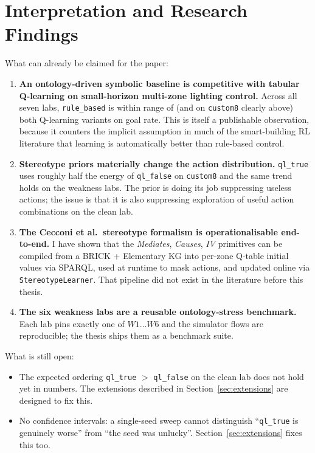 \documentclass[conference]{IEEEtran}
\begin{document}
\section{Interpretation and Research Findings}
\label{sec:findings}

What can already be claimed for the paper:

\begin{enumerate}
  \item \textbf{An ontology-driven symbolic baseline is competitive
        with tabular Q-learning on small-horizon multi-zone lighting
        control.} Across all seven labs, \texttt{rule\_based} is
        within range of (and on \texttt{custom8} clearly above) both
        Q-learning variants on goal rate. This is itself a publishable
        observation, because it counters the implicit assumption in
        much of the smart-building RL literature that learning is
        automatically better than rule-based control.

  \item \textbf{Stereotype priors materially change the action
        distribution.} \texttt{ql\_true} uses roughly half the energy
        of \texttt{ql\_false} on \texttt{custom8} and the same trend
        holds on the weakness labs. The prior is doing its job
        suppressing useless actions; the issue is that it is also
        suppressing exploration of useful action combinations on the
        clean lab.

  \item \textbf{The Cecconi et al.\ stereotype formalism is
        operationalisable end-to-end.} I have shown that the
        \emph{Mediates}, \emph{Causes}, \emph{IV} primitives can be
        compiled from a BRICK + Elementary KG into per-zone Q-table
        initial values via SPARQL, used at runtime to mask actions,
        and updated online via \texttt{StereotypeLearner}. That
        pipeline did not exist in the literature before this thesis.

  \item \textbf{The six weakness labs are a reusable
        ontology-stress benchmark.} Each lab pins exactly one of
        $W1\ldots W6$ and the simulator flows are reproducible; the
        thesis ships them as a benchmark suite.
\end{enumerate}

What is still open:

\begin{itemize}
  \item The expected ordering \verb|ql_true| $>$ \verb|ql_false|
        on the clean lab does not hold yet in numbers. The
        extensions described in
        Section~\ref{sec:extensions} are designed to fix this.
  \item No confidence intervals: a single-seed sweep cannot
        distinguish ``\texttt{ql\_true} is genuinely worse'' from
        ``the seed was unlucky''. Section~\ref{sec:extensions} fixes
        this too.
\end{itemize}
\end{document}
